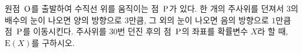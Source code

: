원점~$\mathrm{O}$를 출발하여 수직선 위를 움직이는 점~$\mathrm{P}$가 있다. 한 개의 주사위를 던져서 $3$의 배수의 눈이 나오면 양의 방향으로 $3$만큼, 그 외의 눈이 나오면 음의 방향으로 $1$만큼 점~$\mathrm{P}$를 이동시킨다. 주사위를 30번 던진 후의 점~$\mathrm{P}$의 좌표를 확률변수 $X$라 할 때, $\mathrm{E}(X)$를 구하시오.
